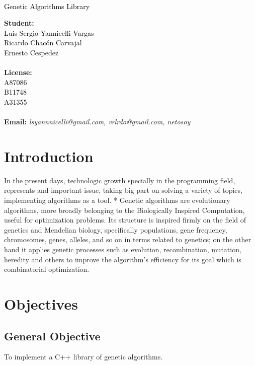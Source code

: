 \documentclass[letterpaper]{article}
\newcommand{\uic}{black} %
\newcommand{\uim}{\\} %
\newcommand{\userinput}[1]{\textcolor{\uic}{\uim#1\uim}}
\begin{document}
\vspace*{2cm}

\begin{center}
\Huge
\userinput{Genetic Algorithms Library}
\vspace*{1cm}
\end{center}

\noindent
\small\baselineskip=14pt
\textbf{Student:} \userinput{Luis Sergio Yannicelli Vargas\\Ricardo Chacón Carvajal\\Ernesto Cespedez}\\
\textbf{License:} \userinput{A87086\\B11748\\A31355}\\
\textbf{Email:} \textit{lsyannnicelli@gmail.com, vrlrdo@gmail.com, netosoy}\\

\section{Introduction}

In the present days, technologic growth specially in the programming field, represents and important issue, taking big part on solving a variety of topics, implementing algorithms as a tool. * Genetic algorithms are evolutionary algorithms, more broadly belonging to the Biologically Inspired Computation, useful for optimization problems. Its structure is inspired firmly on the field of genetics and Mendelian biology, specifically populations, gene frequency, chromosomes, genes, alleles, and so on in terms related to genetics; on the other hand it applies genetic processes such as evolution, recombination, mutation, heredity and others to improve the algorithm's efficiency for its goal which is combinatorial optimization.
\section{Objectives}

\subsection{General Objective}

To implement a C++ library of genetic algorithms.
\end{document}
